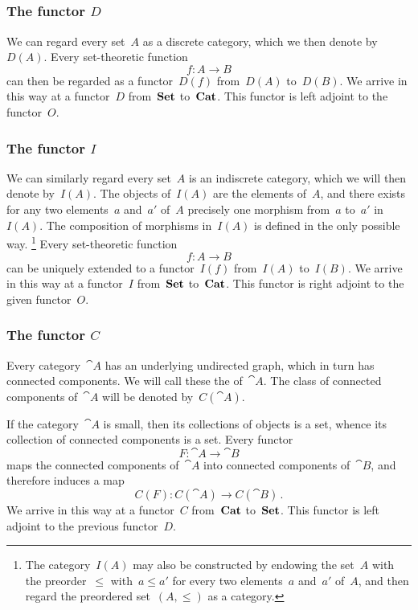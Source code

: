 \subsection{}



\subsubsection*{The functor \texorpdfstring{$D$}{D}}

We can regard every set~$A$ as a discrete category, which we then denote by~$D(A)$.
Every set-theoretic function
\[
	f \colon A \to B
\]
can then be regarded as a functor~$D(f)$ from~$D(A)$ to~$D(B)$.
We arrive in this way at a functor~$D$ from~$\mathbf{Set}$ to~$\mathbf{Cat}$.
This functor is left adjoint to the functor~$O$.



\subsubsection*{The functor \texorpdfstring{$I$}{I}}

We can similarly regard every set~$A$ is an indiscrete category, which we will then denote by~$I(A)$.
The objects of~$I(A)$ are the elements of~$A$, and there exists for any two elements~$a$ and~$a'$ of~$A$ precisely one morphism from~$a$ to~$a'$ in~$I(A)$.
The composition of morphisms in~$I(A)$ is defined in the only possible way.%
\footnote{
	The category~$I(A)$ may also be constructed by endowing the set~$A$ with the preorder~$≤$ with~$a ≤ a'$ for every two elements~$a$ and~$a'$ of~$A$, and then regard the preordered set~$(A, ≤)$ as a category.
}
Every set-theoretic function
\[
	f \colon A \to B
\]
can be uniquely extended to a functor~$I(f)$ from~$I(A)$ to~$I(B)$.
We arrive in this way at a functor~$I$ from~$\mathbf{Set}$ to~$\mathbf{Cat}$.
This functor is right adjoint to the given functor~$O$.



\subsubsection*{The functor \texorpdfstring{$C$}{C}}

Every category~$\cat{A}$ has an underlying undirected graph, which in turn has connected components.
We will call these the  of~$\cat{A}$.
The class of connected components of~$\cat{A}$ will be denoted by~$C(\cat{A})$.

If the category~$\cat{A}$ is small, then its collections of objects is a set, whence its collection of connected components is a set.
Every functor
\[
	F \colon \cat{A} \to \cat{B}
\]
maps the connected components of~$\cat{A}$ into connected components of~$\cat{B}$, and therefore induces a map
\[
	C(F) \colon C(\cat{A}) \to C(\cat{B}) \,.
\]
We arrive in this way at a functor~$C$ from~$\mathbf{Cat}$ to~$\mathbf{Set}$.
This functor is left adjoint to the previous functor~$D$.
